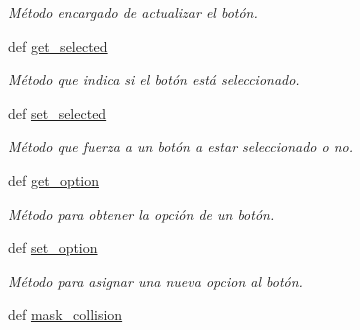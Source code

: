 \begin{DoxyCompactItemize}
\begin{DoxyCompactList}\small\item\em \-Método encargado de actualizar el botón. \end{DoxyCompactList}\item 
def \hyperlink{classengine_1_1button_1_1Button_a2b52f296eae9fb48936262c2e970bb3d}{get\-\_\-selected}
\begin{DoxyCompactList}\small\item\em \-Método que indica si el botón está seleccionado. \end{DoxyCompactList}\item 
def \hyperlink{classengine_1_1button_1_1Button_a0fbdcd2ac333eaa25681e5391ef594d5}{set\-\_\-selected}
\begin{DoxyCompactList}\small\item\em \-Método que fuerza a un botón a estar seleccionado o no. \end{DoxyCompactList}\item 
def \hyperlink{classengine_1_1button_1_1Button_a24ff3671ec98f86615968a8dce515b48}{get\-\_\-option}
\begin{DoxyCompactList}\small\item\em \-Método para obtener la opción de un botón. \end{DoxyCompactList}\item 
def \hyperlink{classengine_1_1button_1_1Button_a94321a0bae6166a96abe0c4902a02ec0}{set\-\_\-option}
\begin{DoxyCompactList}\small\item\em \-Método para asignar una nueva opcion al botón. \end{DoxyCompactList}\item 
\hypertarget{classengine_1_1button_1_1Button_a1c5c5b1a1efec292fc64efe23ac6fa61}{
def \hyperlink{classengine_1_1button_1_1Button_a1c5c5b1a1efec292fc64efe23ac6fa61}{mask\-\_\-collision}}
\label{classengine_1_1button_1_1Button_a1c5c5b1a1efec292fc64efe23ac6fa61}


\end{DoxyCompactItemize}
